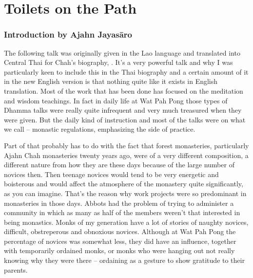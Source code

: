 
\chapter{Toilets on the Path}

\subsection{Introduction by Ajahn Jayas\=aro}

\begingroup\itshape

The following talk was originally given in the Lao language and translated into Central Thai for  Chah's biography, . It's a very powerful talk and why I was particularly keen to include this in the Thai biography and a certain amount of it in the new English version is that nothing quite like it exists in English translation. Most of the work that has been done has focused on the meditation and wisdom teachings. In fact in daily life at Wat Pah Pong those types of Dhamma talks were really quite infrequent and very much treasured when they were given. But the daily kind of instruction and most of the talks were on what we call  -- monastic regulations, emphasizing the  side of practice.

Part of that probably has to do with the fact that forest monasteries, particularly Ajahn Chah monasteries twenty years ago, were of a very different composition, a different nature from how they are these days because of the large number of novices then. Then teenage novices would tend to be very energetic and boisterous and would affect the atmosphere of the monastery quite significantly, as you can imagine. That's the reason why work projects were so predominant in monasteries in those days. Abbots had the problem of trying to administer a community in which as many as half of the members weren't that interested in being monastics. Monks of my generation have a lot of stories of naughty novices, difficult, obstreperous and obnoxious novices. Although at Wat Pah Pong the percentage of novices was somewhat less, they did have an influence, together with temporarily ordained monks, or monks who were hanging out not really knowing why they were there -- ordaining as a gesture to show gratitude to their parents.

